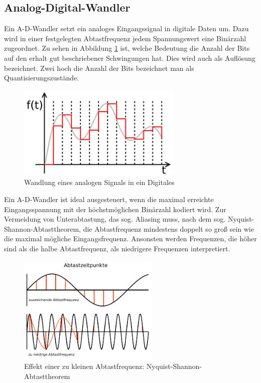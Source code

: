 \subsection{Analog-Digital-Wandler}

Ein A-D-Wandler setzt ein analoges Eingangssignal in digitale Daten um. Dazu wird in einer festgelegten Abtastfrequenz jedem Spannungswert eine Binärzahl zugeordnet.
Zu sehen in Abbildung \ref{adw} ist, welche Bedeutung die Anzahl der Bits auf den erhalt gut beschriebener Schwingungen hat. Dies wird auch als Auflösung bezeichnet. Zwei hoch die Anzahl der Bits bezeichnet man als Quantisierungszustände.
\begin{figure}[H]
     \centering     
     \includegraphics[width=0.7\textwidth]{Abb/adw.pdf}
     \caption{Wandlung eines analogen Signals in ein Digitales}
     \label{adw}
\end{figure}
Ein A-D-Wandler ist ideal ausgesteuert, wenn die maximal erreichte Eingangsspannung mit der höchstmöglichen Binärzahl kodiert wird. 
Zur Vermeidung von Unterabtastung, das sog. Aliasing muss, nach dem sog. Nyquist-Shannon-Abtasttheorem, die Abtastfrequenz mindestens doppelt so groß sein wie die maximal mögliche Eingangsfrequenz. Ansonsten werden Frequenzen, die höher sind als die halbe Abtastfrequenz, als niedrigere Frequenzen interpretiert.
\begin{figure}[H]
    \centering
    \includegraphics[width=0.6\textwidth]{Abb/abtast.pdf} 
    \caption{Effekt einer zu kleinen Abtastfrequenz: Nyquist-Shannon-Abtasttheorem}
\end{figure}

